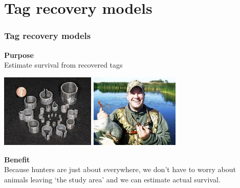\documentclass[color=usenames,dvipsnames]{beamer}\usepackage[]{graphicx}\usepackage[]{xcolor}
\begin{document}
\section{Tag recovery models}


\begin{frame}
  \frametitle{Tag recovery models}
  {\bf Purpose} \\
  Estimate survival from recovered tags \\
  \vspace{0.5cm}
  \begin{center}
    \includegraphics[height=3.5cm,keepaspectratio]{figs/metal-bands}
    \hspace{0.5cm}
    \includegraphics[height=3.5cm,keepaspectratio]{figs/duck-hunter}
  \end{center}
  \pause
  {\bf Benefit} \\
  Because hunters are just about everywhere, we don't have to worry
  about animals leaving `the study area' and we can estimate actual
  survival.
\end{frame}
\end{document}
